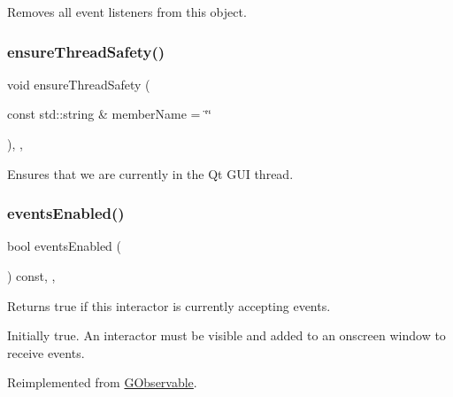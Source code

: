 Removes all event listeners from this object. 

\mbox{\label{classGObservable_a284f31528c0520f8e545c03ac9eeac74}} 
\subsubsection{\texorpdfstring{ensure\+Thread\+Safety()}{ensureThreadSafety()}}
{\footnotesize\ttfamily void ensure\+Thread\+Safety (\begin{DoxyParamCaption}\item[{const std\+::string \&}]{member\+Name = {\ttfamily \char`\"{}\char`\"{}} }\end{DoxyParamCaption})\hspace{0.3cm}{\ttfamily [protected]}, {\ttfamily [virtual]}, {\ttfamily [inherited]}}



Ensures that we are currently in the Qt G\+UI thread. 

\mbox{\label{classGInteractor_a597a370b592e3737d38d9d2f4e2031ea}} 
\subsubsection{\texorpdfstring{events\+Enabled()}{eventsEnabled()}}
{\footnotesize\ttfamily bool events\+Enabled (\begin{DoxyParamCaption}{ }\end{DoxyParamCaption}) const\hspace{0.3cm}{\ttfamily [override]}, {\ttfamily [virtual]}, {\ttfamily [inherited]}}



Returns true if this interactor is currently accepting events. 

Initially true. An interactor must be visible and added to an onscreen window to receive events. 

Reimplemented from \mbox{\hyperlink{classGObservable_a8ebb3da91032e7f4c34485dabc518b8a}{G\+Observable}}.

\mbox{\label{classGObservable_a63e5e5a6227c59c928493b11aceb0f67}} 
